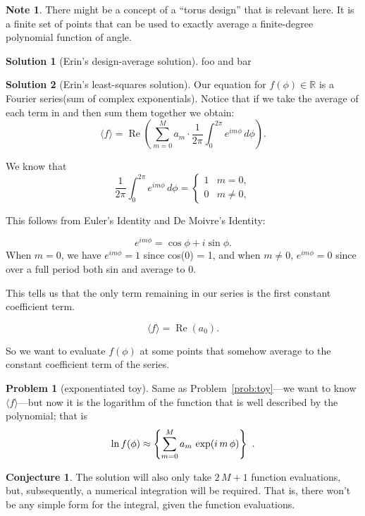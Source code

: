 \documentclass{article}
\let\Re\relax
\DeclareMathOperator{\Re}{Re}
\newcommand{\mean}[1]{\langle{#1}\rangle}
\theoremstyle{definition}
\newcommand{\problemname}{Problem}
\newtheorem{problem}{\problemname}
\newcommand{\probref}[1]{\problemname~\ref{#1}}
\newtheorem{conjecture}{Conjecture}[problem]
\newtheorem{note}{Note}[problem]
\theoremstyle{definition}
\newcommand{\solutionname}{Solution}
\newtheorem{solution}{\solutionname}[problem]
\begin{document}
\begin{note}
There might be a concept of a ``torus design'' that is relevant here.
It is a finite set of points that can be used to exactly average a finite-degree polynomial function of angle.
\end{note}

\begin{solution}[Erin's design-average solution]
foo and bar
\end{solution}

\begin{solution}[Erin's least-squares solution]
Our equation for $f(\phi)\in\mathbb{R}$ is a Fourier series(sum of complex exponentials). Notice that if we take the average of each term in and then sum them together we obtain:
\[
\langle f \rangle = \operatorname{Re}\left( \sum_{m=0}^{M} a_m \cdot \frac{1}{2\pi} \int_{0}^{2\pi} e^{i m \phi} \, d\phi \right).
\]

We know that 
\[
\frac{1}{2\pi} \int_{0}^{2\pi} e^{i m \phi} \, d\phi =
\begin{cases}
1 & m = 0, \\
0 & m \neq 0,
\end{cases}
\]

This follows from Euler's Identity and De Moivre's Identity:

\[
e^{i m \phi} = \cos \phi + i \sin \phi.
\]
When $m = 0$, we have $e^{i m \phi} = 1$ since cos(0) = 1, and when $m \neq 0$, $e^{i m \phi} = 0$ since over a full period both sin and average to 0.

This tells us that the only term remaining in our series is the first constant coefficient term. 

\[
\langle f \rangle = \operatorname{Re}(a_0).
\]

So we want to evaluate $f(\phi)$ at some points that somehow average to the constant coefficient term of the series. 
\end{solution}

\begin{problem}[exponentiated toy]\label{prob:exp}
Same as \probref{prob:toy}---we want to know $\mean{f}$---but now it is the logarithm of the function that is well described by the polynomial; that is
\begin{equation}
    \ln f(\phi) \approx \Re\left\{\sum_{m=0}^M a_m\,\exp(i\,m\,\phi)\right\} ~.
\end{equation}
\end{problem}

\begin{conjecture}
The solution will also only take $2\,M+1$ function evaluations, but, subsequently, a numerical integration will be required.
That is, there won't be any simple form for the integral, given the function evaluations.
\end{conjecture}
\end{document}
